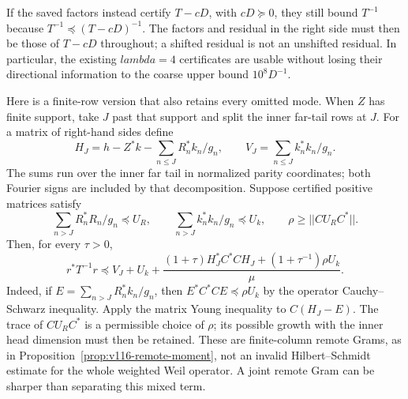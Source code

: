 \documentclass[11pt]{article}
\def\lambda{lambda}%
\def\norm#1{||#1||}%
\theoremstyle{remark}
\newcommand{\norm}[1]{\left\lVert #1\right\rVert}
\begin{document}
If the saved factors instead certify $T-cD$, with $cD\succeq0$,
they still bound $T^{-1}$ because
$T^{-1}\preceq(T-cD)^{-1}$. The factors and residual in the
right side must then be those of $T-cD$ throughout; a shifted
residual is not an unshifted residual. In particular, the existing
$\lambda=4$ certificates are usable without losing their directional
information to the coarse upper bound $10^8D^{-1}$.

Here is a finite-row version that also retains every omitted mode.
When $Z$ has finite support, take $J$ past that support and split the inner far-tail rows
at $J$. For a matrix of right-hand sides define
\[
 H_J=h-Z^*k-\sum_{n\le J}R_n^*k_n/g_n,
 \qquad V_J=\sum_{n\le J}k_n^*k_n/g_n.
\]
The sums run over the inner far tail in normalized parity coordinates;
both Fourier signs are included by that decomposition. Suppose certified positive
matrices satisfy
\[
 \sum_{n>J}R_n^*R_n/g_n\preceq U_R,
 \qquad \sum_{n>J}k_n^*k_n/g_n\preceq U_k,
 \qquad \rho\ge\norm{CU_RC^*}.
\]
Then, for every $\tau>0$,
\begin{equation}\label{eq:v120-structured-finite-rows}
 r^*T^{-1}r\preceq V_J+U_k+
 \frac{(1+\tau)H_J^*C^*CH_J+
             (1+\tau^{-1})\rho U_k}{\mu}.
\end{equation}
Indeed, if $E=\sum_{n>J}R_n^*k_n/g_n$, then
$E^*C^*CE\preceq\rho U_k$ by the operator Cauchy--Schwarz
inequality. Apply the matrix Young inequality to $C(H_J-E)$.
The trace of $CU_RC^*$ is a permissible choice of $\rho$;
its possible growth with the inner head dimension must then be
retained. These are finite-column remote Grams, as in
Proposition~\ref{prop:v116-remote-moment}, not an invalid
Hilbert--Schmidt estimate for the whole weighted Weil operator.
A joint remote Gram can be sharper than separating this mixed term.
\end{document}
